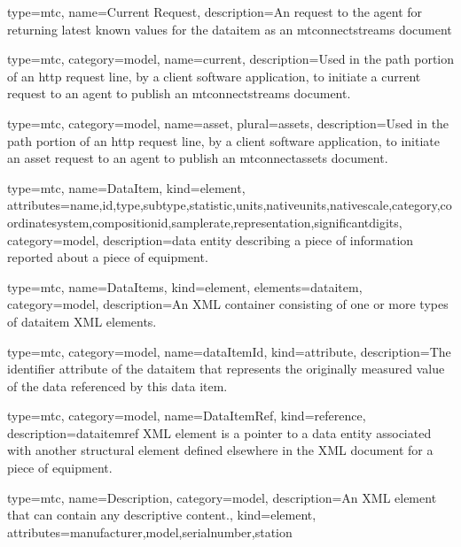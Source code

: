 {
  type=mtc,
  name={Current Request},
  description={An  request to the \gls{agent} for returning latest known values for the \gls{dataitem} as an \glspl{mtconnectstream}  document}
}


{
  type=mtc,
  category=model,
  name={current},
  description={Used in the path portion of an \gls{http request line}, by a client software application, to initiate a \gls{current request} to an \gls{agent} to publish an \glspl{mtconnectstream} document.}
}

{
  type=mtc,
  category=model,
  name={asset},
  plural={assets},
  description={Used in the path portion of an \gls{http request line}, by a client software application, to initiate an \gls{asset request} to an \gls{agent} to publish an \gls{mtconnectassets} document.}
}



{
  type=mtc,
  name={DataItem},
  kind={element},
  attributes={\gls{name},\gls{id},\gls{type},\gls{subtype},\gls{statistic},\gls{units},\gls{nativeunits},\gls{nativescale},\gls{category},\gls{coordinatesystem},\gls{compositionid},\gls{samplerate},\gls{representation},\gls{significantdigits}},
  category=model,
  description={\gls{data entity} describing a piece of information reported about a piece of equipment.}
}


{
  type=mtc,
  name={DataItems},
  kind={element},
  elements={\gls{dataitem}},
  category=model,
  description={An XML container consisting of one or more types of \gls{dataitem} XML elements.}
}

{
  type=mtc,
  category=model,
  name={dataItemId},
  kind={attribute},
  description={The identifier attribute of the \gls{dataitem} that represents the originally measured value of the data referenced by this data item.}
}


{
  type=mtc,
  category=model,
  name={DataItemRef},
  kind={reference},
  description={\gls{dataitemref} XML element is a pointer to a \gls{data entity} associated with another \gls{structural element} defined elsewhere in the XML document for a piece of equipment.}
}


{
  type=mtc,
  name={Description},
  category=model,
  description={An XML element that can contain any descriptive content.},
  kind={element},
  attributes={\gls{manufacturer},\gls{model},\gls{serialnumber},\gls{station}}
}


